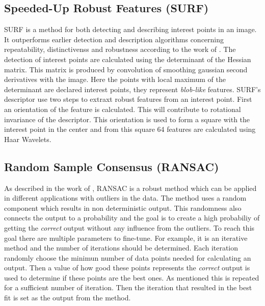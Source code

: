 \subsection{Speeded-Up Robust Features (SURF)}
SURF is a method for both detecting and describing interest points in an image. It outperforms earlier detection and description algorithms concerning repeatability, distinctivenss and robustness according to the work of \cite{SURF}. The detection of interest points are calculated using the determinant of the Hessian matrix. This matrix is produced by convolution of smoothing gaussian second derivatives with the image. Here the points with local maximum of the determinant are declared interest points, they represent {\it blob-like} features. SURF's descriptor use two steps to extraxt robust features from an interest point. First an orientation of the feature is calculated. This will contribute to rotational invariance of the descriptor. This orientation is used to form a square with the interest point in the center and from this square 64 features are calculated using Haar Wavelets.

\subsection{Random Sample Consensus (RANSAC)}
As described in the work of \cite{RANSAC}, RANSAC is a robust method which can be applied in different applications with outliers in the data. The method uses a random component which results in non deterministic output. This randomness also connects the output to a probability and the goal is to create a high probabiliy of getting the {\it correct} output without any influence from the outliers. To reach this goal there are multiple parameters to fine-tune. For example, it is an iterative method and the number of iterations should be determined. Each iteration randomly choose the minimun number of data points needed for calculating an output. Then a value of how good these points represents the {\it correct} output is used to determine if these points are the best ones. As mentioned this is repeated for a sufficient number of iteration. Then the iteration that resulted in the best fit is set as the output from the method.
